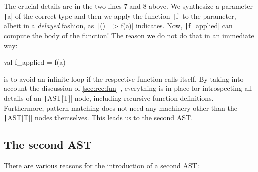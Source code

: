 \documentclass[11pt]{article}
\renewcommand{\vref}[1]{\autoref{#1} \vpageref{#1}}{}
\newcommand{\ScalaI}[1]{\texttt|#1|}
\begin{document}
\noindent The crucial details are in the two lines 7 and 8 above. We 
synthesize a parameter \ScalaI{a} of the correct type and then we apply the 
function \ScalaI{f} to the parameter, albeit in a \textit{delayed} fashion, 
as \ScalaI{() => f(a)} indicates. Now, \ScalaI{f_applied} can compute the 
body of the function! The reason we do not do that in an immediate way:

\begin{ScalaBlockSimple}
val f_applied = f(a)
\end{ScalaBlockSimple}

\noindent is to avoid an infinite loop if the respective function calls 
itself. By taking into account the discussion of \vref{sec:rec:fun}, 
everything is in place for introspecting all details of an \ScalaI{AST[T]} 
node, including recursive function definitions. Furthermore, pattern-matching 
does not need any machinery other than the \ScalaI{AST[T]} nodes themselves. 
This leads us to the second AST.

\subsection{The second AST}
There are various reasons for the introduction of a second AST:
\end{document}
